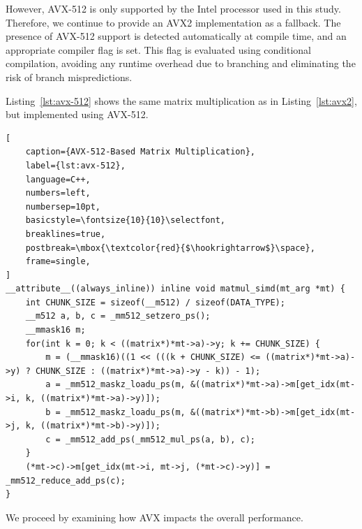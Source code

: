 \documentclass[modern,longauthor]{aastex7}
\begin{document}
However, AVX-512 is only supported by the Intel processor used in this study. Therefore, we continue to provide an AVX2 implementation as a fallback. The presence of AVX-512 support is detected automatically at compile time, and an appropriate compiler flag is set. This flag is evaluated using conditional compilation, avoiding any runtime overhead due to branching and eliminating the risk of branch mispredictions.

Listing~\ref{lst:avx-512} shows the same matrix multiplication as in Listing~\ref{lst:avx2}, but implemented using AVX-512.
\newpage
\begin{lstlisting}[
    caption={AVX-512-Based Matrix Multiplication},
    label={lst:avx-512},
    language=C++,
    numbers=left,
    numbersep=10pt,
    basicstyle=\fontsize{10}{10}\selectfont,
    breaklines=true,
    postbreak=\mbox{\textcolor{red}{$\hookrightarrow$}\space},
    frame=single,
]
__attribute__((always_inline)) inline void matmul_simd(mt_arg *mt) {
    int CHUNK_SIZE = sizeof(__m512) / sizeof(DATA_TYPE);
    __m512 a, b, c = _mm512_setzero_ps();
    __mmask16 m;
    for(int k = 0; k < ((matrix*)*mt->a)->y; k += CHUNK_SIZE) {
        m = (__mmask16)((1 << (((k + CHUNK_SIZE) <= ((matrix*)*mt->a)->y) ? CHUNK_SIZE : ((matrix*)*mt->a)->y - k)) - 1);
        a = _mm512_maskz_loadu_ps(m, &((matrix*)*mt->a)->m[get_idx(mt->i, k, ((matrix*)*mt->a)->y)]);
        b = _mm512_maskz_loadu_ps(m, &((matrix*)*mt->b)->m[get_idx(mt->j, k, ((matrix*)*mt->b)->y)]);
        c = _mm512_add_ps(_mm512_mul_ps(a, b), c);
    }
    (*mt->c)->m[get_idx(mt->i, mt->j, (*mt->c)->y)] = _mm512_reduce_add_ps(c);
}
\end{lstlisting}

We proceed by examining how AVX impacts the overall performance.
\end{document}
